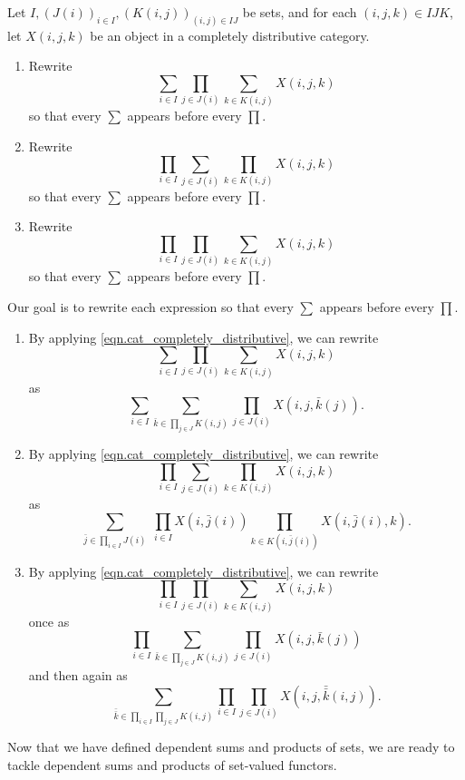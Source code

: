 \documentclass[Book-Poly]{subfiles}
\begin{document}
\begin{exercise} \label{exc.push_prod_sum_set}
Let $I, (J(i))_{i\in I}, (K(i,j))_{(i,j)\in IJ}$ be sets, and for each $(i,j,k)\in IJK$, let $X(i,j,k)$ be an object in a completely distributive category.
\begin{enumerate}
    \item Rewrite
    \[
        \sum_{i\in I}\prod_{j\in J(i)}\sum_{k\in K(i,j)}X(i,j,k)
    \]
    so that every $\sum$ appears before every $\prod$.
    \item Rewrite
    \[
        \prod_{i\in I}\sum_{j\in J(i)}\prod_{k\in K(i,j)}X(i,j,k)
    \]
    so that every $\sum$ appears before every $\prod$.
    \item Rewrite
    \[
        \prod_{i\in I}\prod_{j\in J(i)}\sum_{k\in K(i,j)}X(i,j,k)
    \]
    so that every $\sum$ appears before every $\prod$.\qedhere
\end{enumerate}
\begin{solution}
Our goal is to rewrite each expression so that every $\sum$ appears before every $\prod$.
\begin{enumerate}
    \item By applying \eqref{eqn.cat_completely_distributive}, we can rewrite
    \[
        \sum_{i\in I}\prod_{j\in J(i)}\sum_{k\in K(i,j)}X(i,j,k)
    \]
    as
    \[
        \sum_{i\in I}\sum_{\bar{k}\in \prod_{j\in J}K(i,j)}\prod_{j\in J(i)}X(i,j,\bar{k}(j)).
    \]
    \item By applying \eqref{eqn.cat_completely_distributive}, we can rewrite
    \[
        \prod_{i\in I}\sum_{j\in J(i)}\prod_{k\in K(i,j)}X(i,j,k)
    \]
    as
    \[
        \sum_{\bar{j}\in \prod_{i\in I}J(i)}\;\prod_{i\in I}X(i,\bar{j}(i))\prod_{k\in K(i,\bar{j}(i))}X(i,\bar{j}(i),k).
    \]
    \item By applying \eqref{eqn.cat_completely_distributive}, we can rewrite
    \[
        \prod_{i\in I}\prod_{j\in J(i)}\sum_{k\in K(i,j)}X(i,j,k)
    \]
    once as
    \[
        \prod_{i\in I}\sum_{\bar{k}\in\prod_{j\in J}K(i,j)}\prod_{j\in J(i)}X(i,j,\bar{k}(j))
    \]
    and then again as
    \[
        \sum_{\bar{\bar{k}}\in\prod_{i\in I}\prod_{j\in J}K(i,j)}\prod_{i\in I}\prod_{j\in J(i)}X(i,j,\bar{\bar{k}}(i,j)).
    \]
\end{enumerate}
\end{solution}
\end{exercise}

Now that we have defined dependent sums and products of sets, we are ready to tackle dependent sums and products of set-valued functors.
\end{document}
